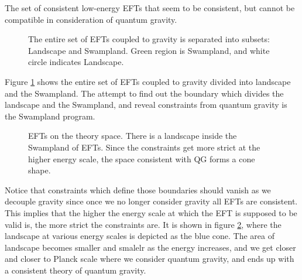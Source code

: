 \begin{tcolorbox}[title=The Swampland,
    title filled=false,
    colback=blue!5!white,
    colframe=blue!75!black]
    The set of consistent low-energy EFTs that seem to be consistent, but cannot be compatible in consideration of quantum gravity.
\end{tcolorbox} 
\begin{figure}
    \centering
    \caption{The entire set of EFTs coupled to gravity is separated into subsets: Landscape and Swampland. Green region is Swampland, and white circle indicates Landscape.}
    \label{fig:set}
\end{figure}
Figure \ref{fig:set} shows the entire set of EFTs coupled to gravity divided into landscape and the Swampland. The attempt to find out the boundary which divides the landscape and the Swampland, and reveal constraints from quantum gravity is the Swampland program.
 

\begin{figure}
\caption{EFTs on the theory space. There is a landscape inside the Swampland of EFTs. Since the constraints get more strict at the higher energy scale, the space consistent with QG forms a cone shape.}
\label{fig:swampland}
\end{figure}
Notice that constraints which define those boundaries should vanish as we decouple gravity since once we no longer consider gravity all EFTs are consistent. This implies that the higher the energy scale at which the EFT is supposed to be valid is, the more strict the constraints are. It is shown in figure \ref{fig:swampland}, where the landscape at various energy scales is depicted as the blue cone. The area of landscape becomes smaller and smalelr as the energy increases, and we get closer and closer to Planck scale where we consider quantum gravity, and ends up with a consistent theory of quantum gravity. \\

